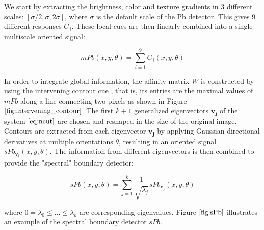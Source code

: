 \documentclass{SMBV12}
\begin{document}
We start by extracting the brightness, color and texture gradients in 3 different scales: $[\sigma/2, \sigma, 2\sigma]$, where $\sigma$ is the default scale of the Pb detector. This gives 9 different responses ${G_i}$. These local cues are then linearly combined into a single multiscale oriented signal:

\begin{equation}
mPb(x, y, \theta) = \sum\limits_{i = 1}^{9}G_i(x, y, \theta)
\end{equation}

In order to integrate global information, the affinity matrix $W$ is constructed by using the intervening contour cue \cite{leung1998contour}, that is, its entries are the maximal values of $mPb$ along a line connecting two pixels as shown in Figure $\ref{fig:intervening_contour}$. The first $k + 1$ generalized eigenvectors $\mathbf{v_j}$ of the system $\ref{eq:ncut}$ are chosen and reshaped in the size of the original image. Contours are extracted from each eigenvector $\mathbf{v_j}$ by applying Gaussian directional derivatives at multiple orientations $\theta$, resulting in an oriented signal $sPb_{\mathbf{v_j}}(x, y, \theta)$. The information from different eigenvectors is then combined to provide the "spectral" boundary detector:

\begin{equation}
sPb(x, y, \theta) = \sum\limits_{j=1}^{k}\dfrac{1}{\sqrt{\lambda_j}}sPb_{\mathbf{v_j}}(x, y, \theta)
\end{equation}

where $0 = \lambda_0 \leq ... \leq \lambda_k$ are corresponding eigenvalues. Figure $\ref{fig:sPb}$ illustrates an example of the spectral boundary detector $sPb$.
\end{document}
